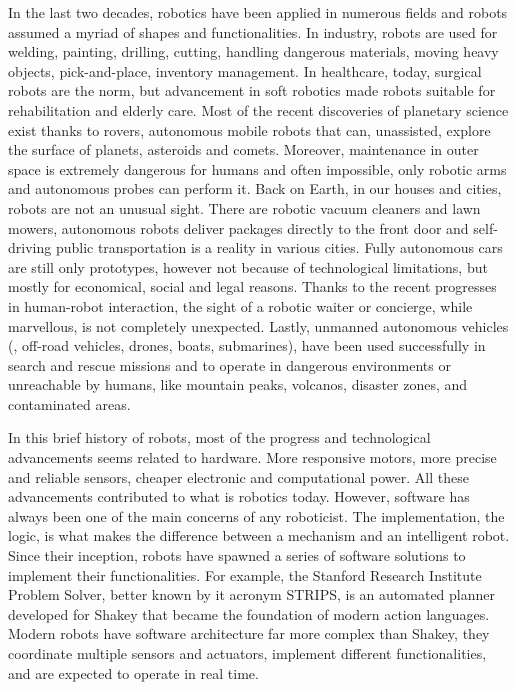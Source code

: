 In the last two decades, robotics have been applied in numerous fields and robots assumed a myriad of shapes and functionalities. In industry, robots are used for welding, painting, drilling, cutting, handling dangerous materials, moving heavy objects, pick-and-place, inventory management. In healthcare, today, surgical robots are the norm, but advancement in soft robotics made robots suitable for rehabilitation and elderly care. Most of the recent discoveries of planetary science exist thanks to rovers, autonomous mobile robots that can, unassisted, explore the surface of planets, asteroids and comets. Moreover, maintenance in outer space is extremely dangerous for humans and often impossible, only robotic arms and autonomous probes can perform it. Back on Earth, in our houses and cities, robots are not an unusual sight. There are robotic vacuum cleaners and lawn mowers,  autonomous robots deliver packages directly to the front door and self-driving public transportation is a reality in various cities. Fully autonomous cars are still only prototypes, however not because of technological limitations, but mostly for economical, social and legal reasons. Thanks to the recent progresses in human-robot interaction, the sight of a robotic waiter or concierge, while marvellous, is not completely unexpected. Lastly, unmanned autonomous vehicles (\eg, off-road vehicles, drones, boats, submarines),  have been used successfully in search and rescue missions and to operate in dangerous environments or unreachable by humans, like mountain peaks, volcanos, disaster zones, and contaminated areas.

In this brief history of robots, most of the progress and technological advancements seems related to hardware. More responsive motors, more precise and reliable sensors, cheaper electronic and computational power. All these advancements contributed to what is robotics today. However, software has always been one of the main concerns of any roboticist. The implementation, the logic, is what makes the difference between a mechanism and an intelligent robot. Since their inception, robots have spawned a series of software solutions to implement their functionalities. For example, the Stanford Research Institute Problem Solver, better known by it acronym STRIPS, is an automated planner developed for Shakey that became the foundation of modern action languages. Modern robots have software architecture far more complex than Shakey, they coordinate multiple sensors and actuators,  implement different functionalities, and are expected to operate in real time.

